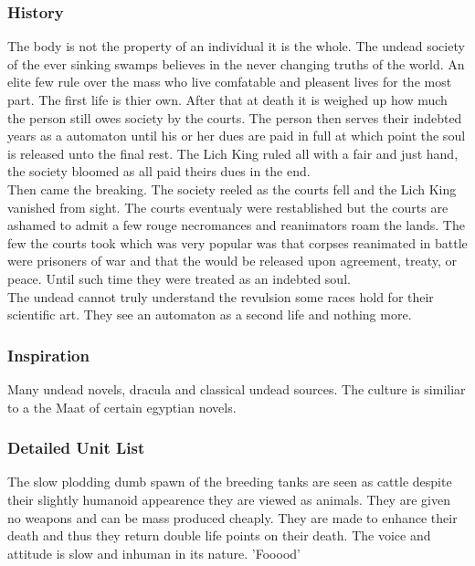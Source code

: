 \documentclass[a4paper]{article}
\begin{document}
\subsubsection{History}

The body is not the property of an individual it is the whole. The undead society of the ever sinking swamps believes in the never changing truths of the world. An elite few rule over the mass who live comfatable and pleasent lives for the most part. The first life is thier own. After that at death it is weighed up how much the person still owes society by the courts. The person then serves their indebted years as a automaton until his or her dues are paid in full at which point the soul is released unto the final rest. The Lich King ruled all with a fair and just hand, the society bloomed as all paid theirs dues in the end.\\
Then came the breaking. The society reeled as the courts fell and the Lich King vanished from sight. The courts eventualy were restablished but the courts are ashamed to admit a few rouge necromances and reanimators roam the lands. The few the courts took which was very popular was that corpses reanimated in battle were prisoners of war and that the would be released upon agreement, treaty, or peace. Until such time they were treated as an indebted soul.\\
The undead cannot truly understand the revulsion some races hold for their scientific art. They see an automaton as a second life and nothing more.

\subsubsection{Inspiration}

Many undead novels, dracula and classical undead sources. The culture is similiar to a the Maat of certain egyptian novels. 

\subsubsection{Detailed Unit List}

The slow plodding dumb spawn of the breeding tanks are seen as cattle despite their slightly humanoid appearence they are viewed as animals. They are given no weapons and can be mass produced cheaply. They are made to enhance their death and thus they return double life points on their death. The voice and attitude is slow and inhuman in its nature. 'Fooood'
\end{document}
